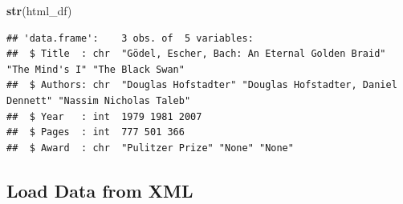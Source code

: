 \documentclass[
]{article}
\newenvironment{Shaded}{\begin{snugshade}}{\end{snugshade}}
\newcommand{\FunctionTok}[1]{\textcolor[rgb]{0.13,0.29,0.53}{\textbf{#1}}}
\newcommand{\NormalTok}[1]{#1}
\begin{document}
\begin{Shaded}
\begin{Highlighting}[]
\FunctionTok{str}\NormalTok{(html\_df)}
\end{Highlighting}
\end{Shaded}

\begin{verbatim}
## 'data.frame':    3 obs. of  5 variables:
##  $ Title  : chr  "Gödel, Escher, Bach: An Eternal Golden Braid" "The Mind's I" "The Black Swan"
##  $ Authors: chr  "Douglas Hofstadter" "Douglas Hofstadter, Daniel Dennett" "Nassim Nicholas Taleb"
##  $ Year   : int  1979 1981 2007
##  $ Pages  : int  777 501 366
##  $ Award  : chr  "Pulitzer Prize" "None" "None"
\end{verbatim}

\subsection{Load Data from XML}\label{load-data-from-xml}
\end{document}
